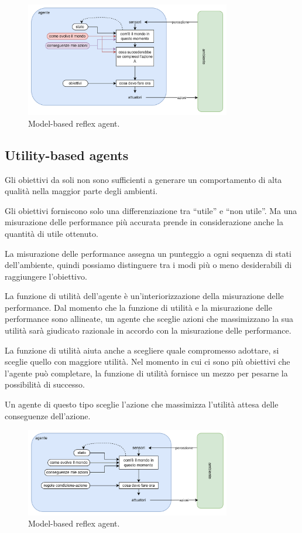 \begin{figure}[H]
	\centering
	\includegraphics[width=0.8\textwidth]{capitoli/agenti-intelligenti/imgs/goal-based.png}
	\caption{Model-based reflex agent.}
\end{figure}

\subsection{Utility-based agents}

Gli obiettivi da soli non sono sufficienti a generare un comportamento di alta qualità nella maggior parte degli ambienti.

Gli obiettivi forniscono solo una differenziazione tra “utile” e “non utile”. Ma una misurazione delle performance più accurata prende in considerazione anche la quantità di utile ottenuto.

La misurazione delle performance assegna un punteggio a ogni sequenza di stati dell'ambiente, quindi possiamo distinguere tra i modi più o meno desiderabili di raggiungere l'obiettivo.

La funzione di utilità dell'agente è un'interiorizzazione della misurazione delle performance.
Dal momento che la funzione di utilità e la misurazione delle performance sono allineate, un agente che sceglie azioni che massimizzano la sua utilità sarà giudicato razionale in accordo con la misurazione delle performance.

La funzione di utilità aiuta anche a scegliere quale compromesso adottare, si sceglie quello con maggiore utilità. Nel momento in cui ci sono più obiettivi che l'agente può completare, la funzione di utilità fornisce un mezzo per pesarne la possibilità di successo.

Un agente di questo tipo sceglie l'azione che massimizza l'utilità attesa delle conseguenze dell'azione.

\begin{figure}[H]
	\centering
	\includegraphics[width=0.8\textwidth]{capitoli/agenti-intelligenti/imgs/model-based.png}
	\caption{Model-based reflex agent.}
\end{figure}

